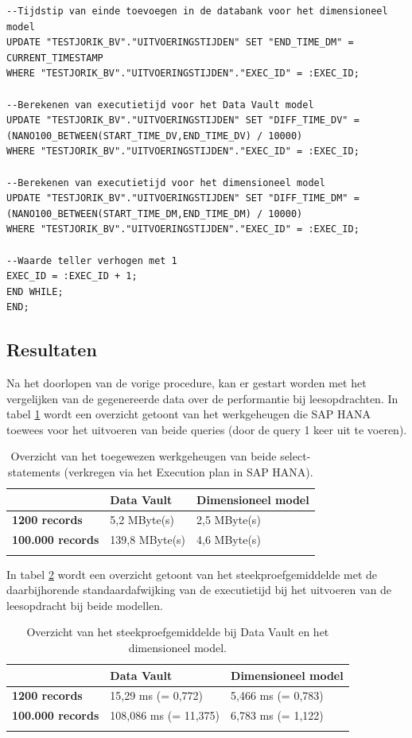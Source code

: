 \begin{lstlisting}[frame=single]
--Tijdstip van einde toevoegen in de databank voor het dimensioneel model
UPDATE "TESTJORIK_BV"."UITVOERINGSTIJDEN" SET "END_TIME_DM" = CURRENT_TIMESTAMP
WHERE "TESTJORIK_BV"."UITVOERINGSTIJDEN"."EXEC_ID" = :EXEC_ID;

--Berekenen van executietijd voor het Data Vault model
UPDATE "TESTJORIK_BV"."UITVOERINGSTIJDEN" SET "DIFF_TIME_DV" = (NANO100_BETWEEN(START_TIME_DV,END_TIME_DV) / 10000)
WHERE "TESTJORIK_BV"."UITVOERINGSTIJDEN"."EXEC_ID" = :EXEC_ID;

--Berekenen van executietijd voor het dimensioneel model
UPDATE "TESTJORIK_BV"."UITVOERINGSTIJDEN" SET "DIFF_TIME_DM" = (NANO100_BETWEEN(START_TIME_DM,END_TIME_DM) / 10000)
WHERE "TESTJORIK_BV"."UITVOERINGSTIJDEN"."EXEC_ID" = :EXEC_ID;

--Waarde teller verhogen met 1
EXEC_ID = :EXEC_ID + 1;
END WHILE;
END;
\end{lstlisting}

\subsection{Resultaten}
Na het doorlopen van de vorige procedure, kan er gestart worden met het vergelijken van de gegenereerde data over de performantie bij leesopdrachten. In tabel \ref{tab:mem} wordt een overzicht getoont van het werkgeheugen die SAP HANA toewees voor het uitvoeren van beide queries (door de query 1 keer uit te voeren). 

\begin{center}
	\renewcommand{\arraystretch}{2}%
	\begin{longtable}{  l  p{}  p{} }
	    \ & \textbf{Data Vault} & \textbf{Dimensioneel model} \\ \hline
		\textbf{1200 records} & 5,2 MByte(s) & 2,5 MByte(s) \\ \hline
		\textbf{100.000 records} & 139,8 MByte(s) & 4,6 MByte(s) \\
		\caption{Overzicht van het toegewezen werkgeheugen van beide select-statements (verkregen via het Execution plan in SAP HANA).}
		\label{tab:mem}
	\end{longtable}
\end{center}

In tabel \ref{tab:spg} wordt een overzicht getoont van het steekproefgemiddelde met de daarbijhorende standaardafwijking van de executietijd bij het uitvoeren van de leesopdracht bij beide modellen.

\begin{center}
	\renewcommand{\arraystretch}{2}%
	\begin{longtable}{  l  p{}  p{} }
		\ & \textbf{Data Vault} & \textbf{Dimensioneel model} \\ \hline
		 \textbf{1200 records} & 15,29 ms (\sigma = 0,772) & 5,466 ms (\sigma = 0,783) \\ \hline
		 \textbf{100.000 records} & 108,086 ms (\sigma = 11,375)  & 6,783 ms (\sigma = 1,122) \\
		\caption{Overzicht van het steekproefgemiddelde bij Data Vault en het dimensioneel model.}
		\label{tab:spg}
	\end{longtable}
\end{center}


